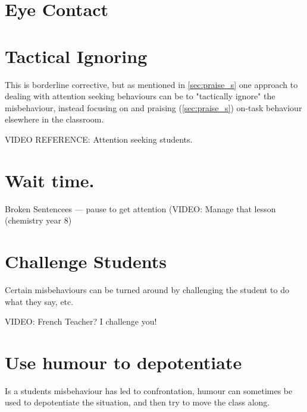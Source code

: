 \documentclass[12pt]{report}
\begin{document}
\section{Eye Contact}
\label{sec:eye_contact_s}

\section{Tactical Ignoring}
\label{sec:tactical_ignoring_s}

This is borderline corrective, but as mentioned in \ref{sec:praise_s} one approach to dealing with attention seeking behaviours can be to "tactically ignore" the misbehaviour, instead focusing on and praising (\ref{sec:praise_s}) on-task behaviour elsewhere in the classroom. 

VIDEO REFERENCE: Attention seeking students. 

\section{Wait time.}
\label{sec:wait_time_s}


Broken Sentencees --- pause to get attention (VIDEO: Manage that lesson (chemistry year 8)

\section{Challenge Students}
\label{sec:challenge_s}

Certain misbehaviours can be turned around by challenging the student to do what they say, etc. 

VIDEO: French Teacher? I challenge you! 

\section{Use humour to depotentiate}
\label{sec:humour_s}

Is a students misbehaviour has led to confrontation, humour can sometimes be used to depotentiate the situation, and then try to move the class along.
\end{document}
